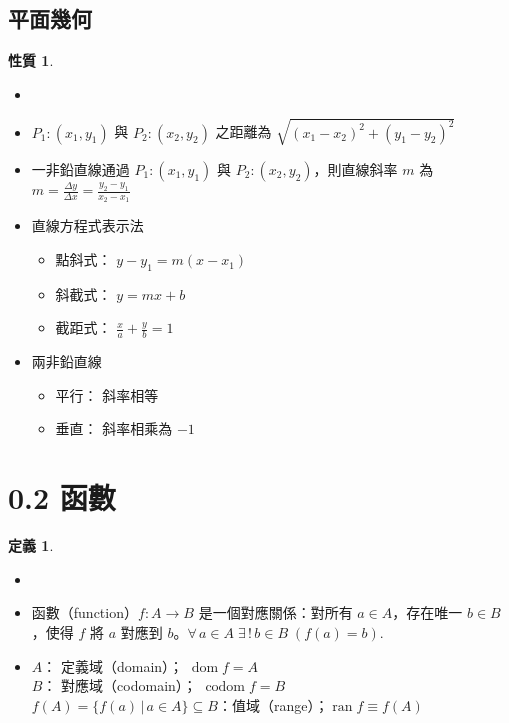 \documentclass[12pt]{extarticle}
\newcommand{\ds}{\displaystyle}
\DeclareMathOperator*{\dom}{dom}
\DeclareMathOperator*{\codom}{codom}
\DeclareMathOperator*{\ran}{ran}
\theoremstyle{definition}
\newtheorem*{dfn}{定義}
\newtheorem*{prp}{性質}
\newcommand{\myline}{\noindent\makebox[\linewidth]{\rule{\paperwidth}{0.4pt}}}
\begin{document}
\subsection*{平面幾何}

\begin{prp}
  \begin{itemize}\setlength\itemsep{0em}
    \item[]
    \item $P_1: (x_1, y_1)$ 與 $P_2: (x_2, y_2)$ 之距離為 $\ds \sqrt{(x_1 - x_2)^2 + (y_1 - y_2)^2}$
    \item 一非鉛直線通過 $P_1: (x_1, y_1)$ 與 $P_2: (x_2, y_2)$，則直線斜率 $m$ 為 $\ds m = \frac{\Delta y}{\Delta x} = \frac{y_2 - y_1}{x_2 - x_1}$
    \item 直線方程式表示法
      \begin{itemize}\setlength\itemsep{0em}
        \item 點斜式： $\ds y - y_1 = m(x - x_1)$
        \item 斜截式： $\ds y = m x + b$
        \item 截距式： $\ds \frac{x}{a} + \frac{y}{b} = 1$
      \end{itemize}
    \item 兩非鉛直線
      \begin{itemize}\setlength\itemsep{0em}
        \item 平行： 斜率相等 
        \item 垂直： 斜率相乘為 $-1$
      \end{itemize}
  \end{itemize}
\end{prp}

\myline

\section*{0.2 函數}

\begin{dfn}
  \begin{itemize}\setlength\itemsep{0em}
    \item[]
    \item 函數（function）$f:A\to B$ 是一個對應關係：對所有 $a\in A$，存在唯一 $b\in B$，使得 $f$ 將 $a$ 對應到 $b$。$\ds\forall\,a\in A\;\exists\,!\,b\in B\;(f(a) = b)$.
    \item $A$： 定義域（domain）； $\dom f = A$ \\
          $B$： 對應域（codomain）； $\codom f = B$ \\
          $f(A) = \{f(a)\,|\,a\in A\}\subseteq B$：值域（range）；$\ran f \equiv f(A)$      
  \end{itemize}
\end{dfn}
\end{document}
